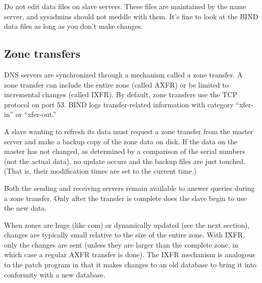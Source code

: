 Do not edit data files on slave servers. These files are maintained by
the name server, and sysadmins should not meddle with them. It's fine to
look at the BIND data files as long as you don't make changes.

\protect\hypertarget{part0024_split_051.html}{}{}

\hypertarget{part0024_split_051.htmlux5cux23_idContainer1069}{}
\hypertarget{part0024_split_051.htmlux5cux23calibre_pb_50}{%
\subsection[Zone
transfers]{\texorpdfstring{\protect\hypertarget{part0024_split_051.htmlux5cux23_idTextAnchor927}{}{}Zone
transfers}{Zone transfers}}\label{part0024_split_051.htmlux5cux23calibre_pb_50}}

\protect\hypertarget{part0024_split_051.htmlux5cux23_idIndexMarker2219}{}{}\protect\hypertarget{part0024_split_051.htmlux5cux23_idIndexMarker2220}{}{}\protect\hypertarget{part0024_split_051.htmlux5cux23_idIndexMarker2221}{}{}\protect\hypertarget{part0024_split_051.htmlux5cux23_idIndexMarker2222}{}{}\protect\hypertarget{part0024_split_051.htmlux5cux23_idIndexMarker2223}{}{}DNS
servers are synchronized through a mechanism called a zone transfer. A
zone transfer can include the entire zone (called AXFR) or be limited to
incremental changes (called IXFR). By default, zone transfers use the
TCP protocol on port 53. BIND logs transfer-related information with
category ``xfer-in'' or ``xfer-out.''

A slave wanting to refresh its data must request a zone transfer from
the master server and make a backup copy of the zone data on disk. If
the data on the master has not changed, as determined by a comparison of
the serial numbers (not the actual data), no update occurs and the
backup files are just touched. (That is, their modification times are
set to the current time.)

Both the sending and receiving servers remain available to answer
queries during a zone transfer. Only after the transfer is complete does
the slave begin to use the new data.

When zones are huge (like com) or dynamically updated (see the next
section), changes are typically small relative to the size of the entire
zone. With IXFR, only the changes are sent (unless they are larger than
the complete zone, in which case a regular AXFR transfer is done). The
IXFR mechanism is analogous to the {patch} program in that it makes
changes to an old database to bring it into conformity with a new
database.

